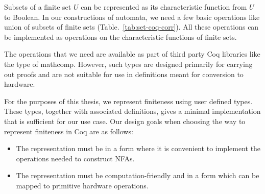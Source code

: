 Subsets of a finite set $U$ can be represented as its characteristic
function from $U$ to Boolean.
%
In our constructions of automata, we need a few basic operations like
union of subsets of finite sets (Table.~\ref{tab:set-coq-corr}).
All these operations can be implemented as operations on the
characteristic functions of finite sets.



The operations that we need are available as part of third party Coq
libraries like the  type of mathcomp.
However, such types are designed primarily for carrying out proofs and
are not suitable for use in definitions meant for conversion to
hardware.


For the purposes of this thesis, we represent finiteness using user
defined types.
These types, together with associated definitions, gives a minimal
implementation that is sufficient for our use case.
%
Our design goals when
choosing the way to represent finiteness in Coq are as follows:
\begin{itemize}
  \item
    The representation must be in a form where it is convenient to
    implement the operations needed to construct \glspl{NFA}.
  \item
    The representation must be computation-friendly and in a form
    which can be mapped to primitive hardware operations.
\end{itemize}

